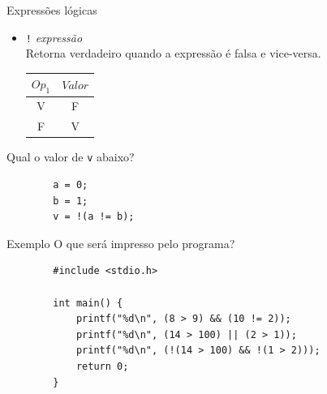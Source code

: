 \documentclass[handout]{beamer}
\newcommand{\cod}[1]{\texttt{#1}}
\begin{document}
\begin{frame}[fragile]{Expressões lógicas}

    \begin{itemize}
        \item \cod{!} {\it expressão} \\
        Retorna verdadeiro quando a expressão é falsa e vice-versa.

        \begin{center}
            \begin{tabular}{|c||c|}
                \hline
                $Op_1$ & $Valor$ \\ \hline
                V & F \\
                F & V \\
                \hline
            \end{tabular}
        \end{center}
    \end{itemize}

    Qual o valor de \cod{v} abaixo?
    \begin{verbatim}
        a = 0;
        b = 1;
        v = !(a != b);
    \end{verbatim}
\end{frame}

\begin{frame}[fragile]{Exemplo}
    O que será impresso pelo programa?

    \begin{verbatim}
        #include <stdio.h>

        int main() {
            printf("%d\n", (8 > 9) && (10 != 2));
            printf("%d\n", (14 > 100) || (2 > 1));
            printf("%d\n", (!(14 > 100) && !(1 > 2)));
            return 0;
        }
    \end{verbatim}
\end{frame}
\end{document}
